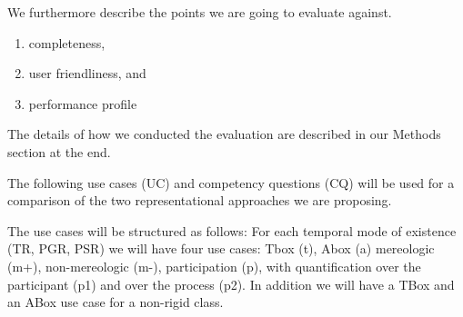 We furthermore describe the points we are going to evaluate against.
\begin{enumerate}
    \item completeness,
    \item user friendliness, and
    \item performance profile
\end{enumerate}
The details of how we conducted the evaluation are described in our Methods section at the end.




The following use cases (UC) and competency questions (CQ) will be used for a comparison of the two representational approaches we are proposing. 

The use cases will be structured as follows: For each temporal mode of existence (TR, PGR, PSR) we will have four use cases: 
Tbox (t), Abox (a) mereologic (m+), non-mereologic (m-), participation (p), with quantification over the participant (p1) and over the process (p2). In addition we will have a TBox and an ABox use case for a non-rigid class. 

